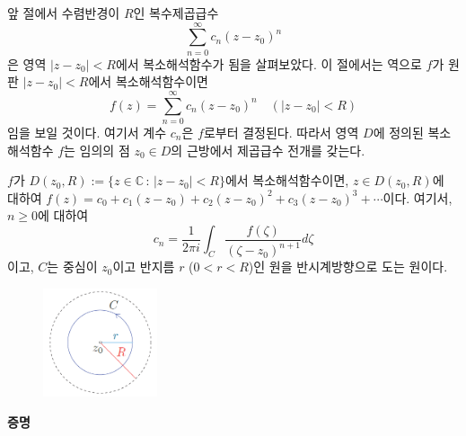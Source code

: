 앞 절에서 수렴반경이 $R$인 복수제곱급수
\[
\sum_{n=0}^\infty c_n(z-z_0)^n
\]
은 영역 $|z-z_0|<R$에서 복소해석함수가 됨을 살펴보았다.
이 절에서는 역으로 $f$가 원판 $|z-z_0|<R$에서 복소해석함수이면
\[
f(z) = \sum_{n=0}^\infty c_n (z-z_0)^n \quad (|z-z_0|<R)
\]
임을 보일 것이다. 여기서 계수 $c_n$은 $f$로부터 결정된다.
따라서 영역 $D$에 정의된 복소해석함수 $f$는 임의의 점 $z_0\in D$의 근방에서
제곱급수 전개를 갖는다.

\begin{salt_theorem}\label{thm-4-4}
$f$가 $D(z_0,R) := \{ z\in \mathbb C \,:\, |z-z_0| <R \}$에서 복소해석함수이면,
$z\in D(z_0,R)$에 대하여
$f(z) = c_0 + c_1(z-z_0) + c_2(z-z_0)^2 + c_3(z-z_0)^3+ \cdots$이다.
여기서, $n\ge0$에 대하여
\[
c_n = \dfrac1{2\pi i} \int_C \dfrac{f(\zeta)}{(\zeta-z_0)^{n+1}} d\zeta
\]
이고, $C$는 중심이 $z_0$이고 반지름 $r$ ($0<r<R$)인 원을 반시계방향으로 도는 원이다.
\end{salt_theorem}

\begin{figure}[h!]
\begin{center}
\includegraphics[width=0.3\textwidth]{./SaltChapter/fig-4-0-4}
\end{center}
\end{figure}

{\bf 증명}

